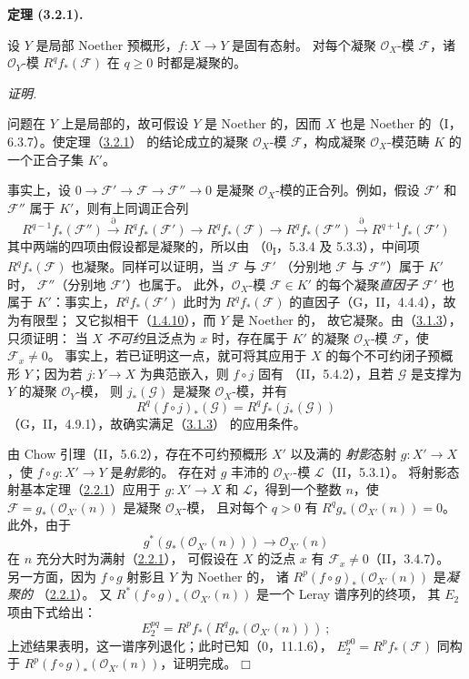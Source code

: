 \documentclass[UTF8,fontset=none,11pt,oneside,openany]{ctexbook}
\providecommand{\square}{\mdlgwhtsquare}
\newenvironment{theorem}[1][]{%
  \par\medskip\noindent\textbf{定理 (#1).}\ %
}{\par}
\newenvironment{proof}{%
  \par\smallskip\noindent\textit{证明.}\ %
}{\hfill$\square$\par}
\newcommand{\oldpage}[2][]{%
  \hypertarget{ega-source-page-#1-#2}{}%
  \marginnote{\scriptsize\textbf{#1}~|~#2}\ignorespaces}
\let\EGAOriginalLabel\label
\renewcommand{\label}[1]{\phantomsection\EGAOriginalLabel{#1}}
\begin{document}
\begin{theorem}[3.2.1]
\label{III.3.2.1-fr}
设 $Y$ 是局部 Noether 预概形，$f:X\to Y$ 是固有态射。
对每个凝聚 $\mathcal O_X$-模 $\mathcal F$，诸 $\mathcal O_Y$-模
$R^qf_*(\mathcal F)$ 在 $q\geq0$ 时都是凝聚的。
\end{theorem}

\begin{proof}
问题在 $Y$ 上是局部的，故可假设 $Y$ 是 Noether 的，因而 $X$
也是 Noether 的（I，6.3.7）。使定理（\hyperref[III.3.2.1-fr]{3.2.1}）
的结论成立的凝聚 $\mathcal O_X$-模 $\mathcal F$，构成凝聚
$\mathcal O_X$-模范畴 $K$ 的一个正合子集 $K'$。

\oldpage[III]{117}
事实上，设 $0\to\mathcal F'\to\mathcal F\to\mathcal F''\to0$
是凝聚 $\mathcal O_X$-模的正合列。例如，假设 $\mathcal F'$ 和
$\mathcal F''$ 属于 $K'$，则有上同调正合列
\[
R^{q-1}f_*(\mathcal F'')\xrightarrow{\partial}R^qf_*(\mathcal F')
\longrightarrow R^qf_*(\mathcal F)\longrightarrow R^qf_*(\mathcal F'')
\xrightarrow{\partial}R^{q+1}f_*(\mathcal F')
\]
其中两端的四项由假设都是凝聚的，所以由
（0\textsubscript{I}，5.3.4 及 5.3.3），中间项 $R^qf_*(\mathcal F)$
也凝聚。同样可以证明，当 $\mathcal F$ 与 $\mathcal F'$
（分别地 $\mathcal F$ 与 $\mathcal F''$）属于 $K'$ 时，
$\mathcal F''$（分别地 $\mathcal F'$）也属于。
此外，$\mathcal O_X$-模 $\mathcal F\in K'$ 的每个凝聚\emph{直因子}
$\mathcal F'$ 也属于 $K'$：事实上，$R^qf_*(\mathcal F')$ 此时为
$R^qf_*(\mathcal F)$ 的直因子（G，II，4.4.4），故为有限型；
又它拟相干（\hyperref[III.1.4.10-fr]{1.4.10}），而 $Y$ 是 Noether 的，
故它凝聚。由（\hyperref[III.3.1.3-fr]{3.1.3}），只须证明：
当 $X$ \emph{不可约}且泛点为 $x$ 时，存在属于 $K'$ 的凝聚
$\mathcal O_X$-模 $\mathcal F$，使 $\mathcal F_x\neq0$。
事实上，若已证明这一点，就可将其应用于 $X$ 的每个不可约闭子预概形
$Y$；因为若 $j:Y\to X$ 为典范嵌入，则 $f\circ j$ 固有
（II，5.4.2），且若 $\mathcal G$ 是支撑为 $Y$ 的凝聚 $\mathcal O_Y$-模，
则 $j_*(\mathcal G)$ 是凝聚 $\mathcal O_X$-模，并有
\[
R^q(f\circ j)_*(\mathcal G)=R^qf_*(j_*(\mathcal G))
\]
（G，II，4.9.1），故确实满足（\hyperref[III.3.1.3-fr]{3.1.3}）
的应用条件。

由 Chow 引理（II，5.6.2），存在不可约预概形 $X'$ 以及满的
\emph{射影}态射 $g:X'\to X$，使 $f\circ g:X'\to Y$ 是\emph{射影}的。
存在对 $g$ 丰沛的 $\mathcal O_{X'}$-模 $\mathcal L$（II，5.3.1）。
将射影态射基本定理（\hyperref[III.2.2.1-fr]{2.2.1}）应用于
$g:X'\to X$ 和 $\mathcal L$，得到一个整数 $n$，使
$\mathcal F=g_*(\mathcal O_{X'}(n))$ 是凝聚 $\mathcal O_X$-模，
且对每个 $q>0$ 有 $R^qg_*(\mathcal O_{X'}(n))=0$。
此外，由于
\[
g^*(g_*(\mathcal O_{X'}(n)))\longrightarrow\mathcal O_{X'}(n)
\]
在 $n$ 充分大时为满射（\hyperref[III.2.2.1-fr]{2.2.1}），
可假设在 $X$ 的泛点 $x$ 有 $\mathcal F_x\neq0$（II，3.4.7）。
另一方面，因为 $f\circ g$ 射影且 $Y$ 为 Noether 的，
诸 $R^p(f\circ g)_*(\mathcal O_{X'}(n))$ 是\emph{凝聚的}
（\hyperref[III.2.2.1-fr]{2.2.1}）。
又 $R^*(f\circ g)_*(\mathcal O_{X'}(n))$ 是一个 Leray 谱序列的终项，
其 $E_2$ 项由下式给出：
\[
E_2^{pq}=R^pf_*(R^qg_*(\mathcal O_{X'}(n)))~;
\]
上述结果表明，这一谱序列退化；此时已知（0，11.1.6），
$E_2^{p0}=R^pf_*(\mathcal F)$ 同构于
$R^p(f\circ g)_*(\mathcal O_{X'}(n))$，证明完成。
\end{proof}
\end{document}

